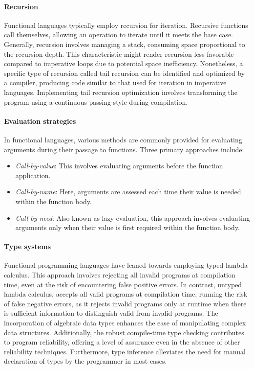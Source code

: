 \documentclass[12pt,a4paper,openright,twoside]{book}
\begin{document}
\paragraph{Recursion}

Functional languages typically employ recursion for iteration. Recursive functions call themselves, allowing an operation to iterate until it meets the base case. Generally, recursion involves managing a stack, consuming space proportional to the recursion depth. This characteristic might render recursion less favorable compared to imperative loops due to potential space inefficiency. Nonetheless, a specific type of recursion called tail recursion can be identified and optimized by a compiler, producing code similar to that used for iteration in imperative languages. Implementing tail recursion optimization involves transforming the program using a continuous passing style during compilation.

\paragraph{Evaluation strategies}

In functional languages, various methods are commonly provided for evaluating arguments during their passage to functions. Three primary approaches include:

\begin{itemize}
    \item \textit{Call-by-value}: This involves evaluating arguments before the function application.
    \item \textit{Call-by-name}: Here, arguments are assessed each time their value is needed within the function body.
    \item \textit{Call-by-need}: Also known as lazy evaluation, this approach involves evaluating arguments only when their value is first required within the function body.
\end{itemize}

\paragraph{Type systems}

Functional programming languages have leaned towards employing typed lambda calculus. This approach involves rejecting all invalid programs at compilation time, even at the risk of encountering false positive errors. In contrast, untyped lambda calculus, accepts all valid programs at compilation time, running the risk of false negative errors, as it rejects invalid programs only at runtime when there is sufficient information to distinguish valid from invalid programs. The incorporation of algebraic data types enhances the ease of manipulating complex data structures. Additionally, the robust compile-time type checking contributes to program reliability, offering a level of assurance even in the absence of other reliability techniques. Furthermore, type inference alleviates the need for manual declaration of types by the programmer in most cases.
\end{document}
